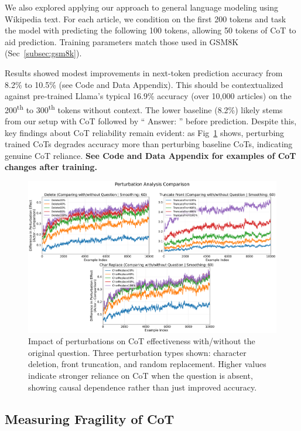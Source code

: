\documentclass[letterpaper]{article} %
\begin{document}
We also explored applying our approach to general language modeling using Wikipedia text. For each article, we condition on the first 200 tokens and task the model with predicting the following 100 tokens, allowing 50 tokens of CoT to aid prediction. Training parameters match those used in GSM8K (Sec~\ref{subsec:gsm8k}).

Results showed modest improvements in next-token prediction accuracy from 8.2\% to 10.5\% (see Code and Data Appendix). This should be contextualized against pre-trained Llama's typical 16.9\% accuracy (over 10,000 articles) on the 200\textsuperscript{th} to 300\textsuperscript{th} tokens without context. The lower baseline (8.2\%) likely stems from our setup with CoT followed by `` Answer: '' before prediction. Despite this, key findings about CoT reliability remain evident: as Fig~\ref{fig:perturbation} shows, perturbing trained CoTs degrades accuracy more than perturbing baseline CoTs, indicating genuine CoT reliance.
\textbf{See Code and Data Appendix for examples of CoT changes after training.}

\begin{figure}[ht]
  \centering
  \includegraphics[width=\textwidth]{Figures/combined_perturbation_plot_comparison_question_centered.png}
  \caption{Impact of perturbations on CoT effectiveness with/without the original question. Three perturbation types shown: character deletion, front truncation, and random replacement. Higher values indicate stronger reliance on CoT when the question is absent, showing causal dependence rather than just improved accuracy.}
  \label{fig:perturbation}
\end{figure}


\subsection{Measuring Fragility of CoT}\label{subsec:fragile}
\end{document}
